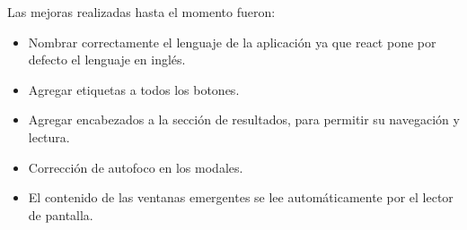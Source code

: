 Las mejoras realizadas hasta el momento fueron:
\begin{itemize}
  \item Nombrar correctamente el lenguaje de la aplicación ya que react pone por defecto el lenguaje en inglés.
  \item Agregar etiquetas a todos los botones.
  \item Agregar encabezados a la sección de resultados, para permitir su navegación y lectura.
  \item Corrección de autofoco en los modales.
  \item El contenido de las ventanas emergentes se lee automáticamente por el lector de pantalla.
\end{itemize}
